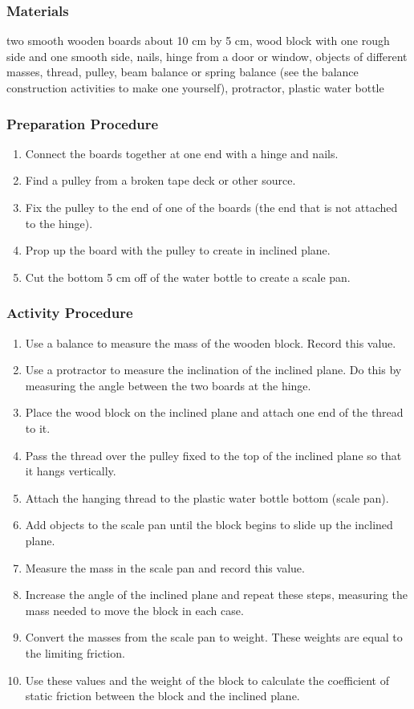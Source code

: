 \subsubsection*{Materials}
two smooth wooden boards about 10 cm by 5 cm, wood block with one rough side and one smooth side, nails, hinge from a door or window, objects of different masses, thread, pulley, beam balance or spring balance (see the balance construction activities to make one yourself), protractor, plastic water bottle

\subsubsection*{Preparation Procedure}
\begin{enumerate}
\item{Connect the boards together at one end with a hinge and nails.} 
\item{Find a pulley from a broken tape deck or other source.} 
\item{Fix the pulley to the end of one of the boards (the end that is not attached to the hinge).} 
\item{Prop up the board with the pulley to create in inclined plane.} 
\item{Cut the bottom 5 cm off of the water bottle to create a scale pan.} 
\end{enumerate}

\subsubsection*{Activity Procedure}
\begin{enumerate}
\item{Use a balance to measure the mass of the wooden block. Record this value.} 
\item{Use a protractor to measure the inclination of the inclined plane. Do this by measuring the angle between the two boards at the hinge.} 
\item{Place the wood block on the inclined plane and attach one end of the thread to it.} 
\item{Pass the thread over the pulley fixed to the top of the inclined plane so that it hangs vertically.} 
\item{Attach the hanging thread to the plastic water bottle bottom (scale pan).} 
\item{Add objects to the scale pan until the block begins to slide up the inclined plane.} 
\item{Measure the mass in the scale pan and record this value.} 
\item{Increase the angle of the inclined plane and repeat these steps, measuring the mass needed to move the block in each case.} 
\item{Convert the masses from the scale pan to weight. These weights are equal to the limiting friction.} 
\item{Use these values and the weight of the block to calculate the coefficient of static friction between the block and the inclined plane.} 
\end{enumerate}

